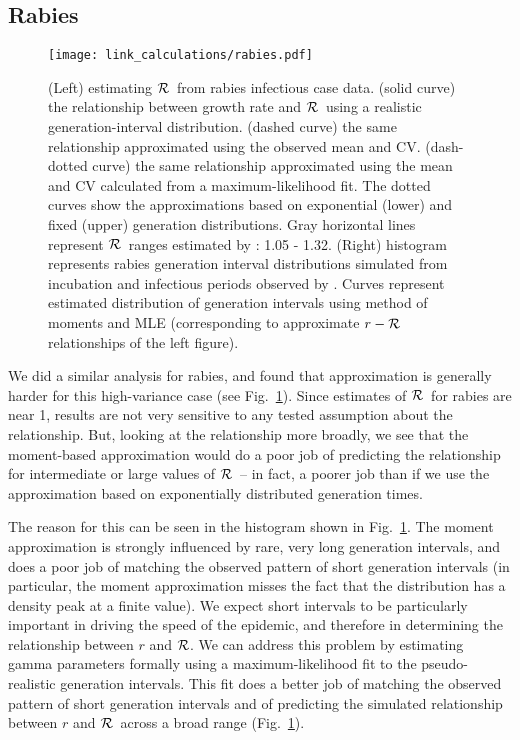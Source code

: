 \documentclass[12pt]{article}
\newcommand{\RR}{\ensuremath{{\cal R}}}
\newcommand{\fref}[1]{Fig.~\ref{fig:#1}}
\begin{document}
\subsection{Rabies}
\label{Rabies_example}

\begin{figure}[htbp] \centering
	\texttt{[image: link\_calculations/rabies.pdf]}
	\caption{(Left) estimating \RR~from rabies infectious case data.
		(solid curve) the relationship between growth rate and \RR~using a realistic generation-interval distribution.
		(dashed curve) the same relationship approximated using the observed mean and CV.
		(dash-dotted curve) the same relationship approximated using the mean and CV calculated from a maximum-likelihood fit.
		The dotted curves show the approximations based on exponential (lower) and fixed (upper) generation distributions.
		Gray horizontal lines represent \RR\ ranges estimated by \cite{HampDush09}: 1.05 - 1.32.
		(Right) histogram represents rabies generation interval distributions simulated from incubation and infectious periods observed by \cite{HampDush09}.
		Curves represent estimated distribution of generation intervals using method of moments and MLE (corresponding to approximate $r-\RR$ relationships of the left figure).
	}
	\label{fig:rabiesCurve}
\end{figure}

We did a similar analysis for rabies, and found that approximation is generally harder for this high-variance case (see \fref{rabiesCurve}). Since estimates of \RR\ for rabies are near 1, results are not very sensitive to any tested assumption about the relationship. But, looking at the relationship more broadly, we see that the moment-based approximation would do a poor job of predicting the relationship for intermediate or large values of \RR\ -- in fact, a poorer job than if we use the approximation based on exponentially distributed generation times. 

The reason for this can be seen in the histogram shown in \fref{rabiesCurve}. The moment approximation is strongly influenced by rare, very long generation intervals, and does a poor job of matching the observed pattern of short generation intervals (in particular, the moment approximation misses the fact that the distribution has a density peak at a finite value). We expect short intervals to be particularly important in driving the speed of the epidemic, and therefore in determining the relationship between $r$ and \RR. We can address this problem by estimating gamma parameters formally using a maximum-likelihood fit to the pseudo-realistic generation intervals. This fit does a better job of matching the observed pattern of short generation intervals and of predicting the simulated relationship between $r$ and \RR\ across a broad range (\fref{rabiesCurve}).
\end{document}
